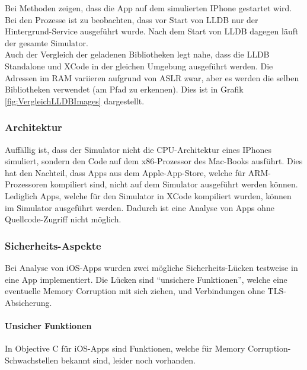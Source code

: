 Bei Methoden zeigen, dass die App auf dem simulierten IPhone gestartet wird. Bei den Prozesse ist zu beobachten, dass vor Start von LLDB nur der Hintergrund-Service ausgeführt wurde. Nach dem Start von LLDB dagegen läuft der gesamte Simulator.\\

Auch der Vergleich der geladenen Bibliotheken legt nahe, dass die LLDB Standalone und XCode in der gleichen Umgebung ausgeführt werden. Die Adressen im RAM variieren aufgrund von ASLR zwar, aber es werden die selben Bibliotheken verwendet (am Pfad zu erkennen). Dies ist in Grafik \ref{fig:VergleichLLDBImages} dargestellt.\\

\begin{figure}[htbp]

\label{fig:LLDB-creating-IPhone-VM}
\end{figure}

\subsubsection{Architektur}
Auffällig ist, dass der Simulator nicht die CPU-Architektur eines IPhones simuliert, sondern den Code auf dem x86-Prozessor des Mac-Books ausführt. Dies hat den Nachteil, dass Apps aus dem Apple-App-Store, welche für ARM-Prozessoren kompiliert sind, nicht auf dem Simulator ausgeführt werden können. Lediglich Apps, welche für den Simulator in XCode kompiliert wurden, können im Simulator ausgeführt werden. Dadurch ist eine Analyse von Apps ohne Quellcode-Zugriff nicht möglich.

\subsubsection{Sicherheits-Aspekte}
Bei Analyse von iOS-Apps wurden zwei mögliche Sicherheits-Lücken testweise in eine App implementiert. Die Lücken sind "`unsichere Funktionen"', welche eine eventuelle Memory Corruption mit sich ziehen, und Verbindungen ohne TLS-Absicherung.

\paragraph{Unsicher Funktionen}
In Objective C für iOS-Apps sind Funktionen, welche für Memory Corruption-Schwachstellen bekannt sind, leider noch vorhanden.\\

